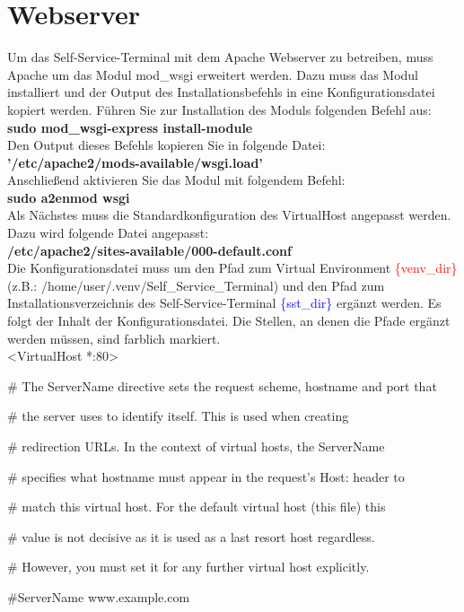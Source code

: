 \section{Webserver}
Um das Self-Service-Terminal mit dem Apache Webserver zu betreiben, muss Apache um das Modul mod\_wsgi erweitert werden. Dazu muss das Modul installiert und der Output des Installationsbefehls in eine Konfigurationsdatei kopiert werden. Führen Sie zur Installation des Moduls folgenden Befehl aus:\\

\textbf{sudo mod\_wsgi-express install-module}\\

\noindent Den Output dieses Befehls kopieren Sie in folgende Datei:\\

\textbf{'/etc/apache2/mods-available/wsgi.load'}\\

\noindent Anschließend aktivieren Sie das Modul mit folgendem Befehl:\\

\textbf{sudo a2enmod wsgi}\\

\noindent Als Nächstes muss die Standardkonfiguration des VirtualHost angepasst werden. Dazu wird folgende Datei angepasst:\\

\textbf{/etc/apache2/sites-available/000-default.conf}\\

\noindent Die Konfigurationsdatei muss um den Pfad zum Virtual Environment \textcolor{red}{\{venv\_dir\}} (z.B.: /home/user/.venv/Self\_Service\_Terminal) und den Pfad zum Installationsverzeichnis des Self-Service-Terminal \textcolor{blue}{\{sst\_dir\}} ergänzt werden. Es folgt der Inhalt der Konfigurationsdatei. Die Stellen, an denen die Pfade ergänzt werden müssen, sind farblich markiert.\\

<VirtualHost *:80>\par
	\# The ServerName directive sets the request scheme, hostname and port that\par
	\# the server uses to identify itself. This is used when creating\par 
	\# redirection URLs. In the context of virtual hosts, the ServerName\par
	\# specifies what hostname must appear in the request's Host: header to\par
	\# match this virtual host. For the default virtual host (this file) this\par
	\# value is not decisive as it is used as a last resort host regardless.\par
	\# However, you must set it for any further virtual host explicitly.\par
	\#ServerName www.example.com\\

